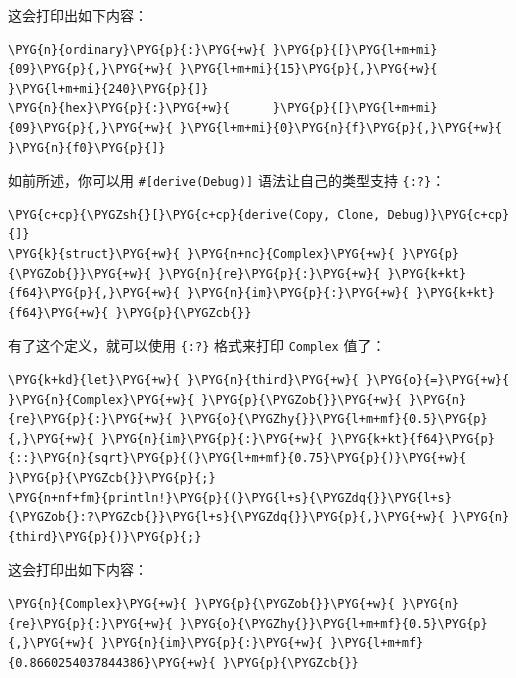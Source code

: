 这会打印出如下内容：

\begin{Verbatim}[commandchars=\\\{\},breaklines=true,breakanywhere=true,fontsize=\codefont,xleftmargin=17bp]
\PYG{n}{ordinary}\PYG{p}{:}\PYG{+w}{ }\PYG{p}{[}\PYG{l+m+mi}{09}\PYG{p}{,}\PYG{+w}{ }\PYG{l+m+mi}{15}\PYG{p}{,}\PYG{+w}{ }\PYG{l+m+mi}{240}\PYG{p}{]}
\PYG{n}{hex}\PYG{p}{:}\PYG{+w}{      }\PYG{p}{[}\PYG{l+m+mi}{09}\PYG{p}{,}\PYG{+w}{ }\PYG{l+m+mi}{0}\PYG{n}{f}\PYG{p}{,}\PYG{+w}{ }\PYG{n}{f0}\PYG{p}{]}
\end{Verbatim}

如前所述，你可以用 \texttt{\#[derive(Debug)]} 语法让自己的类型支持 \texttt{\{:?\}}：

\begin{Verbatim}[commandchars=\\\{\},breaklines=true,breakanywhere=true,fontsize=\codefont,xleftmargin=17bp]
\PYG{c+cp}{\PYGZsh{}[}\PYG{c+cp}{derive(Copy, Clone, Debug)}\PYG{c+cp}{]}
\PYG{k}{struct}\PYG{+w}{ }\PYG{n+nc}{Complex}\PYG{+w}{ }\PYG{p}{\PYGZob{}}\PYG{+w}{ }\PYG{n}{re}\PYG{p}{:}\PYG{+w}{ }\PYG{k+kt}{f64}\PYG{p}{,}\PYG{+w}{ }\PYG{n}{im}\PYG{p}{:}\PYG{+w}{ }\PYG{k+kt}{f64}\PYG{+w}{ }\PYG{p}{\PYGZcb{}}
\end{Verbatim}

有了这个定义，就可以使用 \texttt{\{:?\}} 格式来打印 \texttt{Complex} 值了：

\begin{Verbatim}[commandchars=\\\{\},breaklines=true,breakanywhere=true,fontsize=\codefont,xleftmargin=17bp]
\PYG{k+kd}{let}\PYG{+w}{ }\PYG{n}{third}\PYG{+w}{ }\PYG{o}{=}\PYG{+w}{ }\PYG{n}{Complex}\PYG{+w}{ }\PYG{p}{\PYGZob{}}\PYG{+w}{ }\PYG{n}{re}\PYG{p}{:}\PYG{+w}{ }\PYG{o}{\PYGZhy{}}\PYG{l+m+mf}{0.5}\PYG{p}{,}\PYG{+w}{ }\PYG{n}{im}\PYG{p}{:}\PYG{+w}{ }\PYG{k+kt}{f64}\PYG{p}{::}\PYG{n}{sqrt}\PYG{p}{(}\PYG{l+m+mf}{0.75}\PYG{p}{)}\PYG{+w}{ }\PYG{p}{\PYGZcb{}}\PYG{p}{;}
\PYG{n+nf+fm}{println!}\PYG{p}{(}\PYG{l+s}{\PYGZdq{}}\PYG{l+s}{\PYGZob{}:?\PYGZcb{}}\PYG{l+s}{\PYGZdq{}}\PYG{p}{,}\PYG{+w}{ }\PYG{n}{third}\PYG{p}{)}\PYG{p}{;}
\end{Verbatim}

这会打印出如下内容：

\begin{Verbatim}[commandchars=\\\{\},breaklines=true,breakanywhere=true,fontsize=\codefont,xleftmargin=17bp]
\PYG{n}{Complex}\PYG{+w}{ }\PYG{p}{\PYGZob{}}\PYG{+w}{ }\PYG{n}{re}\PYG{p}{:}\PYG{+w}{ }\PYG{o}{\PYGZhy{}}\PYG{l+m+mf}{0.5}\PYG{p}{,}\PYG{+w}{ }\PYG{n}{im}\PYG{p}{:}\PYG{+w}{ }\PYG{l+m+mf}{0.8660254037844386}\PYG{+w}{ }\PYG{p}{\PYGZcb{}}
\end{Verbatim}

